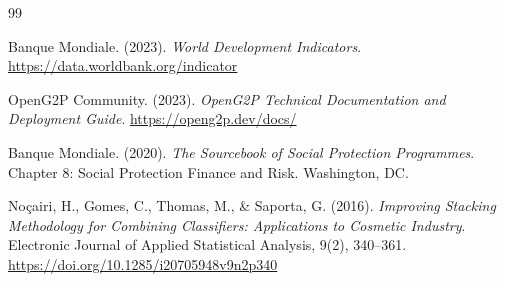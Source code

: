 \documentclass[a4paper, oneside, 12pt]{book}
\begin{document}
 
\begin{thebibliography}{99}
 
Banque Mondiale. (2023). \textit{World Development Indicators}. 
\url{https://data.worldbank.org/indicator}

OpenG2P Community. (2023). \textit{OpenG2P Technical Documentation and Deployment Guide}.
\url{https://openg2p.dev/docs/}

Banque Mondiale. (2020). \textit{The Sourcebook of Social Protection Programmes}.
Chapter 8: Social Protection Finance and Risk. Washington, DC.

Noçairi, H., Gomes, C., Thomas, M., \& Saporta, G. (2016).
\textit{Improving Stacking Methodology for Combining Classifiers: Applications to Cosmetic Industry}.
Electronic Journal of Applied Statistical Analysis, 9(2), 340--361.
\url{https://doi.org/10.1285/i20705948v9n2p340}

\end{thebibliography}
\end{document}
